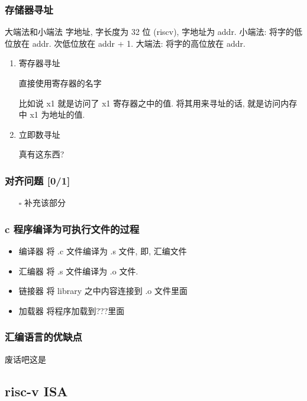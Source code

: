 \documentclass[11pt]{article}
\begin{document}
\subsubsection{存储器寻址}
\label{sec:org7aee35c}

大端法和小端法
字地址, 字长度为 32 位 (riscv), 字地址为 addr.
小端法: 将字的低位放在 addr. 次低位放在 addr + 1.
大端法: 将字的高位放在 addr. 

\begin{enumerate}
\item 寄存器寻址
\label{sec:org7c96002}

直接使用寄存器的名字

比如说 x1 就是访问了 x1 寄存器之中的值. 将其用来寻址的话, 就是访问内存
中 x1 为地址的值. 

\item 立即数寻址
\label{sec:orgd0acc98}

真有这东西?
\end{enumerate}

\subsubsection{对齐问题 [0/1]}
\label{sec:org190ee12}
\begin{itemize}
\item[{$\square$}] 补充该部分
\end{itemize}
\subsubsection{c 程序编译为可执行文件的过程}
\label{sec:orgf19a86e}

\begin{itemize}
\item 编译器 将 .c 文件编译为 .s 文件, 即, 汇编文件
\item 汇编器 将 .s 文件编译为 .o 文件.
\item 链接器 将 library 之中内容连接到 .o 文件里面
\item 加载器 将程序加载到???里面
\end{itemize}

\subsubsection{汇编语言的优缺点}
\label{sec:orgd8564d4}

废话吧这是

\subsection{risc-v ISA}
\label{sec:org5dd0f15}
\end{document}
